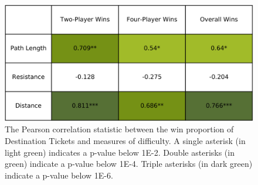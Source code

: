 \begin{multicols}{2}

\begin{figure}[H]
    \centering
    \includegraphics[scale=.12]{figures/pearsons_table.png}
    \caption{The Pearson correlation statistic between
    the win proportion of Destination Tickets
    and measures of difficulty.
    A single asterisk (in light green) indicates a p-value
    below 1E-2. Double asterisks (in green) indicate a
    p-value below 1E-4. Triple asterisks (in dark green)
    indicate a p-value below 1E-6.}
    \label{fig:correlation_table}
\end{figure}


\end{multicols}
